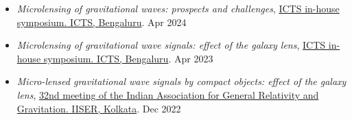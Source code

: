 \begin{itemize}
    \item \textit{Microlensing of gravitational waves: prospects and challenges}, \href{https://www.icts.res.in/inhouse2024}{ICTS in-house symposium. ICTS, Bengaluru}. \hfill{Apr 2024}

    \item \textit{Microlensing of gravitational wave signals: effect of the galaxy lens}, \href{https://www.icts.res.in/inhouse2023}{ICTS in-house symposium. ICTS, Bengaluru}.\hspace{3.1in} Apr 2023

    \item \textit{Micro-lensed gravitational wave signals by compact objects: effect of the galaxy lens}, \href{https://www.iiserkol.ac.in/~iagrg32/}{32nd meeting of the Indian Association for General Relativity and Gravitation. IISER, Kolkata}. \hfill{Dec 2022}
    
\end{itemize}